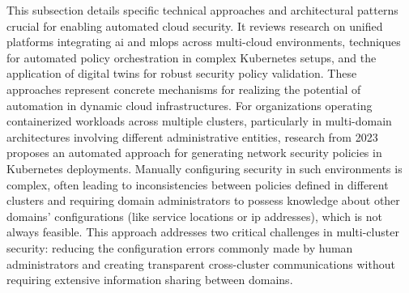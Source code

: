 This subsection details specific technical approaches and architectural patterns crucial for enabling automated cloud security. It reviews research on unified platforms integrating \gls{ai} and \gls{mlops} across multi-cloud environments, techniques for automated policy orchestration in complex Kubernetes setups, and the application of digital twins for robust security policy validation. These approaches represent concrete mechanisms for realizing the potential of automation in dynamic cloud infrastructures.
For organizations operating containerized workloads across multiple clusters, particularly in multi-domain architectures involving different administrative entities, research from 2023 proposes an automated approach for generating network security policies in Kubernetes deployments\cite{bringhenti_security_2023}. Manually configuring security in such environments is complex, often leading to inconsistencies between policies defined in different clusters and requiring domain administrators to possess knowledge about other domains' configurations (like service locations or \gls{ip} addresses), which is not always feasible\cite{bringhenti_security_2023}. This approach addresses two critical challenges in multi-cluster security: reducing the configuration errors commonly made by human administrators and creating transparent cross-cluster communications without requiring extensive information sharing between domains\cite{bringhenti_security_2023}.

